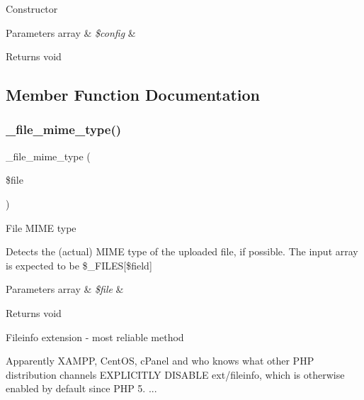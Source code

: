 Constructor


\begin{DoxyParams}[1]{Parameters}
array & {\em \$config} & \\
\hline
\end{DoxyParams}
\begin{DoxyReturn}{Returns}
void 
\end{DoxyReturn}


\subsection{Member Function Documentation}
\mbox{\label{class_c_i___upload_a8ac4511eca70b271965b7f8ef00faf66}} 
\subsubsection{\texorpdfstring{\+\_\+file\+\_\+mime\+\_\+type()}{\_file\_mime\_type()}}
{\footnotesize\ttfamily \+\_\+file\+\_\+mime\+\_\+type (\begin{DoxyParamCaption}\item[{}]{\$file }\end{DoxyParamCaption})\hspace{0.3cm}{\ttfamily [protected]}}

File M\+I\+ME type

Detects the (actual) M\+I\+ME type of the uploaded file, if possible. The input array is expected to be \$\+\_\+\+F\+I\+L\+ES\mbox{[}\$field\mbox{]}


\begin{DoxyParams}[1]{Parameters}
array & {\em \$file} & \\
\hline
\end{DoxyParams}
\begin{DoxyReturn}{Returns}
void 
\end{DoxyReturn}
Fileinfo extension -\/ most reliable method

Apparently X\+A\+M\+PP, Cent\+OS, c\+Panel and who knows what other P\+HP distribution channels E\+X\+P\+L\+I\+C\+I\+T\+LY D\+I\+S\+A\+B\+LE ext/fileinfo, which is otherwise enabled by default since P\+HP 5. ...\mbox{\label{class_c_i___upload_a00936ce870d818794909bf16dc2ff70b}} 
